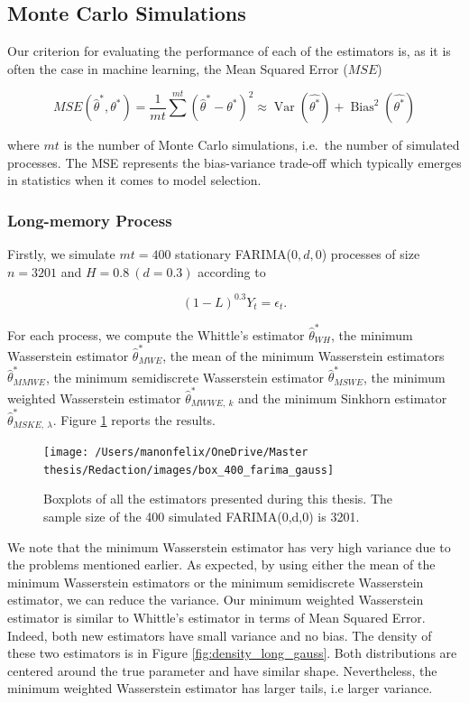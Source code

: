 \documentclass[
  11pt,
]{article}
\begin{document}
\hypertarget{monte-carlo-simulations}{%
\subsection{Monte Carlo Simulations}\label{monte-carlo-simulations}}

Our criterion for evaluating the performance of each of the estimators
is, as it is often the case in machine learning, the Mean Squared Error
(\(MSE\))

\[MSE(\hat \theta^*, \theta^*) =  \frac{1}{mt}\sum^{mt}(\hat \theta^* - \theta^*)^2 \approx \operatorname{Var}(\hat{\theta^*})+\operatorname{Bias}^{2}(\hat{\theta^*})\]

where \(mt\) is the number of Monte Carlo simulations, i.e.~the number
of simulated processes. The MSE represents the bias-variance trade-off
which typically emerges in statistics when it comes to model selection.

\hypertarget{long-memory-process}{%
\subsubsection{Long-memory Process}\label{long-memory-process}}

Firstly, we simulate \(mt = 400\) stationary FARIMA(\(0,d,0\)) processes
of size \(n = 3201\) and \(H = 0.8 \ (d = 0.3)\) according to

\[(1-L)^{0.3}Y_t = \epsilon_t.\]

For each process, we compute the Whittle's estimator
\(\hat \theta^*_{WH}\), the minimum Wasserstein estimator
\(\hat \theta^*_{MWE}\), the mean of the minimum Wasserstein estimators
\(\hat \theta^*_{MMWE}\), the minimum semidiscrete Wasserstein estimator
\(\hat \theta^*_{MSWE}\), the minimum weighted Wasserstein estimator
\(\hat \theta^*_{MWWE, \ k}\) and the minimum Sinkhorn estimator
\(\hat \theta^*_{MSKE,\ \lambda}\). Figure \ref{fig:box_farima_400}
reports the results.

\begin{figure}

{\centering \texttt{[image: /Users/manonfelix/OneDrive/Master thesis/Redaction/images/box\_400\_farima\_gauss]} 

}

\caption{Boxplots of all the estimators presented during this thesis. The sample size of the 400 simulated FARIMA(0,d,0) is 3201.}\label{fig:box_farima_400}
\end{figure}

We note that the minimum Wasserstein estimator has very high variance
due to the problems mentioned earlier. As expected, by using either the
mean of the minimum Wasserstein estimators or the minimum semidiscrete
Wasserstein estimator, we can reduce the variance. Our minimum weighted
Wasserstein estimator is similar to Whittle's estimator in terms of Mean
Squared Error. Indeed, both new estimators have small variance and no
bias. The density of these two estimators is in Figure
\ref{fig:density_long_gauss}. Both distributions are centered around the
true parameter and have similar shape. Nevertheless, the minimum
weighted Wasserstein estimator has larger tails, i.e larger variance.
\end{document}

